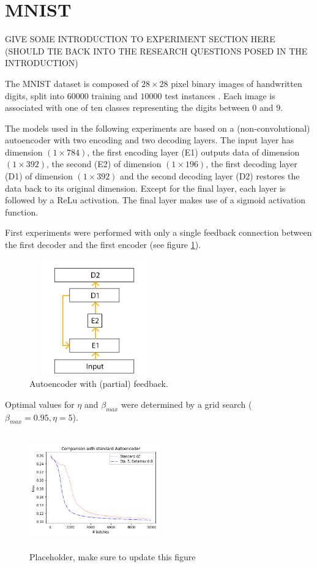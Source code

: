 \documentclass{article}
\begin{document}
\section{MNIST}
\label{mnist}
GIVE SOME INTRODUCTION TO EXPERIMENT SECTION HERE (SHOULD TIE BACK INTO THE RESEARCH QUESTIONS POSED IN THE INTRODUCTION)

The MNIST dataset is composed of $28 \times 28$ pixel binary images of handwritten digits, split into $60000$ training and $10000$ test instances \cite{lecun2010mnist}. Each image is associated with one of ten classes representing the digits between $0$ and $9$. 

The models used in the following experiments are based on a (non-convolutional) autoencoder with two encoding and two decoding layers. The input layer has dimension $(1\times784)$, the first encoding layer (E1) outputs data of dimension $(1\times392)$, the second (E2) of dimension $(1\times196)$, the first decoding layer (D1) of dimension $(1\times392)$ and the second decoding layer (D2) restores the data back to its original dimension. Except for the final layer, each layer is followed by a ReLu activation. The final layer makes use of a sigmoid activation function. 

First experiments were performed with only a single feedback connection between the first decoder and the first encoder (see figure \ref{fig:autoenc}). 

\begin{figure}
      \centering
      \includegraphics[width=0.5\textwidth,height=5cm,keepaspectratio]{img/AutoEnc.png}
      \caption{Autoencoder with (partial) feedback.}
      \label{fig:autoenc}
  \end{figure}
  
Optimal values for $\eta$ and $\beta_{max}$ were determined by a grid search ($\beta_{max}=0.95, \eta=5$).
 \begin{figure}
      \centering
      \includegraphics[width=0.5\textwidth,height=5cm,keepaspectratio]{img/fb_vs_nofb.png}
      \caption{Placeholder, make sure to update this figure}
      \label{fig:fbvsnofb}
  \end{figure}
  
\end{document}
